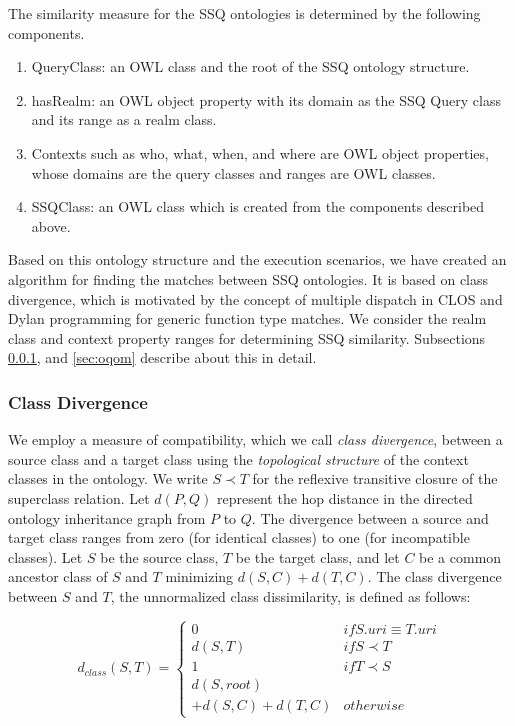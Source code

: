 \documentclass{www2010-submission}
\begin{document}
The similarity measure for the SSQ ontologies is determined by the following components.
\begin{enumerate}
    \item QueryClass: an OWL class and the root of the SSQ ontology structure.
    \item hasRealm: an OWL object property with its domain as the SSQ Query class and its range as a realm class.
    \item Contexts such as who, what, when, and where are OWL object properties, whose domains are the query classes and ranges are OWL classes. 
    \item SSQClass: an OWL class which is created from the components described above.
\end{enumerate}
Based on this ontology structure and the execution scenarios, we have created an algorithm for finding the matches between SSQ ontologies. It is based on class divergence, which is motivated by the concept of multiple dispatch in CLOS \cite{95411} and Dylan programming \cite{Dylan_MultipleInheritance} for generic function type matches. We consider the realm class and context property ranges for determining SSQ similarity. Subsections \ref{sec:ctd}, and \ref{sec:oqom} describe about this in detail.


\subsubsection{Class Divergence}
\label{sec:ctd}
We employ a measure of compatibility, which we call \textit{class divergence}, between a source class and a target class using the \textit{topological structure} of the context classes in the ontology. We write $S \prec T$ for the reflexive transitive closure of the superclass relation. Let $d(P,Q)$ represent the hop distance in the directed ontology inheritance graph from $P$ to $Q$. The divergence between a source and target class ranges from zero (for identical classes) to one (for incompatible classes).  Let $S$ be the source class, $T$ be the target class, and let $C$ be a common ancestor class of $S$ and $T$ minimizing $d(S,C) + d(T,C)$. The class divergence between $S$ and $T$, the unnormalized class dissimilarity, is defined as follows:

\begin{equation}
d_{class}(S, T) = \begin{cases}
0 & if S.{uri} \equiv T.{uri}\\
d(S, T) & if S \prec T\\
1 & if T \prec S\\
d(S,root) \\+ d(S,C) + d(T,C) & otherwise
\end{cases}
\end{equation}
\end{document}
